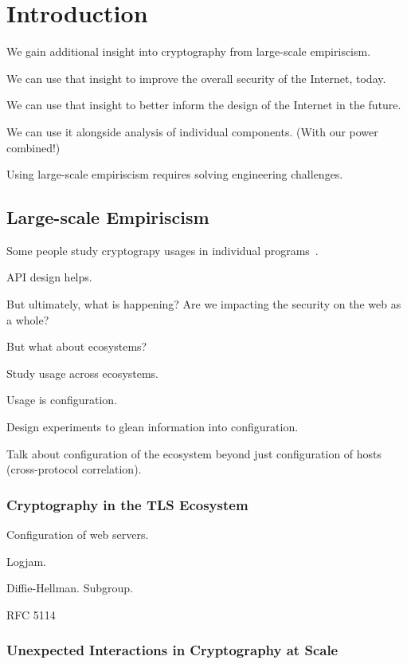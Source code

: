 



\chapter{Introduction}

We gain additional insight into cryptography from large-scale empiriscism.

We can use that insight to improve the overall security of the Internet, today.

We can use that insight to better inform the design of the Internet in the future.

We can use it alongside analysis of individual components. (With our power combined!)

Using large-scale empiriscism requires solving engineering challenges.

\section{Large-scale Empiriscism}

Some people study cryptograpy usages in individual programs~\cite{most-dangerous-code-2012}.

API design helps.

But ultimately, what is happening? Are we impacting the security on the web as a whole?

But what about ecosystems?

Study usage across ecosystems.

Usage is configuration.

Design experiments to glean information into configuration.

Talk about configuration of the ecosystem beyond just configuration of hosts (cross-protocol correlation).

\subsection{Cryptography in the TLS Ecosystem}

Configuration of web servers.

Logjam.

Diffie-Hellman. Subgroup.

RFC 5114

\subsection{Unexpected Interactions in Cryptography at Scale}

